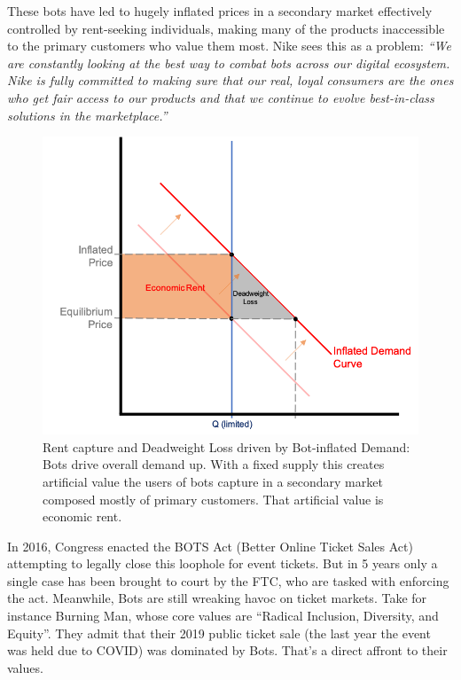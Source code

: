 \documentclass[runningheads]{llncs}
\begin{document}
These bots have led to hugely inflated prices in a secondary market effectively controlled by rent-seeking individuals, making many of the products inaccessible to the primary customers who value them most. Nike sees this as a problem: \emph{“We are constantly looking at the best way to combat bots across our digital ecosystem. Nike is fully committed to making sure that our real, loyal consumers are the ones who get fair access to our products and that we continue to evolve best-in-class solutions in the marketplace.”}\cite{3} 

\begin{figure}[H]
\centering
\includegraphics[scale=0.8]{Figures_and_Tables/Rent-Capture Supply&Demand.png}
\caption{Rent capture and Deadweight Loss driven by Bot-inflated Demand: Bots drive overall demand up.  With a fixed supply this creates artificial value the users of bots capture in a secondary market composed mostly of primary customers.  That artificial value is economic rent.}
\end{figure}

In 2016, Congress enacted the BOTS Act (Better Online Ticket Sales Act) attempting to legally close this loophole for event tickets.\cite{10}   But in 5 years only a single case has been brought to court by the FTC, who are tasked with enforcing the act.\cite{11}   Meanwhile, Bots are still wreaking havoc on ticket markets.  Take for instance Burning Man, whose core values are “Radical Inclusion, Diversity, and Equity”.  They admit that their 2019 public ticket sale (the last year the event was held due to COVID) was dominated by Bots.\cite{12}   That’s a direct affront to their values.
\end{document}
